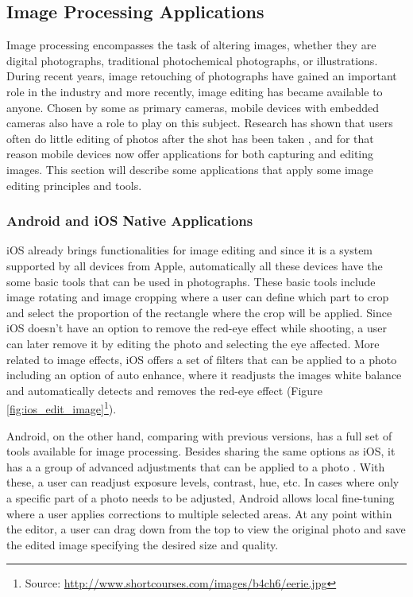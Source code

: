 \subsection{Image Processing Applications}

Image processing encompasses the task of altering images, whether they are digital photographs, traditional photochemical photographs, or illustrations. During recent years, image retouching of photographs have gained an important role in the industry and more recently, image editing has became available to anyone. Chosen by some as primary cameras, mobile devices with embedded cameras also have a role to play on this subject. Research has shown that users often do little editing of photos after the shot has been taken \cite{brewster2012rethinking}, and for that reason mobile devices now offer applications for both capturing and editing images. This section will describe some applications that apply some image editing principles and tools.
 
\subsubsection{Android and iOS Native Applications}

iOS already brings functionalities for image editing and since it is a system supported by all devices from Apple, automatically all these devices have the some basic tools that can be used in photographs.
These basic tools include image rotating and image cropping where a user can define which part to crop and select the proportion of the rectangle where the crop will be applied.
Since iOS doesn't have an option to remove the red-eye effect while shooting, a user can later remove it by editing the photo and selecting the eye affected. More related to image effects, iOS offers a set of filters that can be applied to a photo including an option of auto enhance, where it readjusts the images white balance and automatically detects and removes the red-eye effect (Figure \ref{fig:ios_edit_image}\footnote{Source: \url{http://www.shortcourses.com/images/b4ch6/eerie.jpg}}).

Android, on the other hand, comparing with previous versions, has a full set of tools available for image processing. Besides sharing the same options as iOS, it has a a group of advanced adjustments that can be applied to a photo \cite{Sharon}. With these, a user can readjust exposure levels, contrast, hue, etc. In cases where only a specific part of a photo needs to be adjusted, Android allows local fine-tuning where a user applies corrections to multiple selected areas. At any point within the editor, a user can drag down from the top to view the original photo and save the edited image specifying the desired size and quality.

